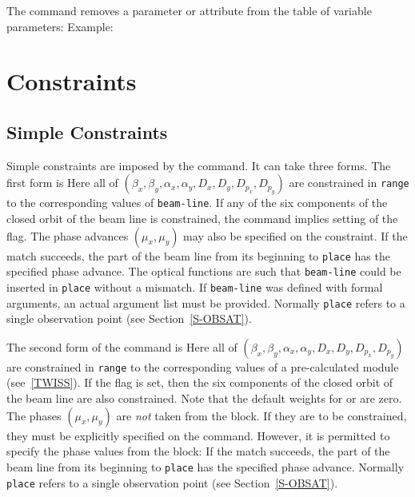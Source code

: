 The command  removes
a parameter or attribute from the table of variable parameters:
Example:
 
\section{Constraints}
\label{S-CONSTR}
\subsection{Simple Constraints}
Simple constraints are imposed by the  command.
It can take three forms. The first form is
Here all of
\((\beta_{x}, \beta_{y}, \alpha_{x}, \alpha_{y},
D_{x}, D_{y}, D_{p_{x}}, D_{p_{y}})\)
are constrained in {\tt range} to the corresponding values
of {\tt beam-line}.
If any of the six components of the closed orbit of the beam line
is constrained, the command implies setting of the  flag.
The phase advances \((\mu_{x},\mu_{y})\) may also be specified on the
constraint.
If the match succeeds,
the part of the beam line from its beginning to {\tt place} has
the specified phase advance.
The optical functions are such that {\tt beam-line}
could be inserted in {\tt place} without a mismatch.
If {\tt beam-line} was defined with formal arguments,
an actual argument list must be provided.
Normally {\tt place} refers to a single observation point
(see Section~\ref{S-OBSAT}).

The second form of the  command is
Here all of
\((\beta_{x}, \beta_{y}, \alpha_{x}, \alpha_{y},
D_{x}, D_{y}, D_{p_{x}}, D_{p_{y}})\)
are constrained in {\tt range} to the corresponding values
of a pre-calculated  module (see~\ref{TWISS}).
If the  flag is set, then the six components of the closed
orbit of the beam line are also constrained.
Note that the default weights for  or  are zero.
The phases \((\mu_{x},\mu_{y})\) are {\em not} taken from the 
block.  If they are to be constrained, they must be explicitly
specified on the  command.  However, it is permitted to
specify the phase values from the  block:
If the match succeeds,
the part of the beam line from its beginning to {\tt place} has
the specified phase advance.
Normally {\tt place} refers to a single observation point
(see Section~\ref{S-OBSAT}).

